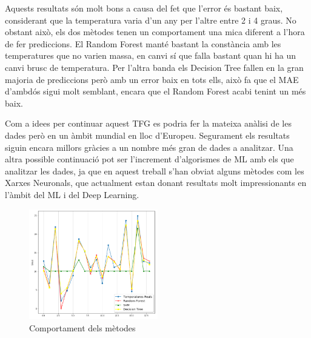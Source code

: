 \documentclass[10pt,a4paper,twocolumn,twoside]{article}
\begin{document}
Aquests resultats són molt bons a causa del fet que l'error és bastant baix, considerant que la temperatura varia d'un any per l'altre entre 2 i 4 graus. No obstant això, els dos mètodes tenen un comportament una mica diferent a l'hora de fer prediccions. El Random Forest manté bastant la constància amb les temperatures que no varien massa, en canvi sí que falla bastant quan hi ha un canvi brusc de temperatura. Per l'altra banda els Decision Tree fallen en la gran majoria de prediccions però amb un error baix en tots ells, això fa que el MAE d'ambdós sigui molt semblant, encara que el Random Forest acabi tenint un més baix.

Com a idees per continuar aquest TFG es podria fer la mateixa anàlisi de les dades però en un àmbit mundial en lloc d'Europeu. Segurament els resultats siguin encara millors gràcies a un nombre més gran de dades a analitzar. Una altra possible continuació pot ser l'increment d'algorismes de ML amb els que analitzar les dades, ja que en aquest treball s'han obviat alguns mètodes com les Xarxes Neuronals, que actualment estan donant resultats molt impressionants en l'àmbit del ML i del Deep Learning.
\begin{figure}[!h]
\centering
	\includegraphics[width=0.5\textwidth]{../img/comparacioAlgs}
	\caption{Comportament dels mètodes}
	\label{fig-temps}
\end{figure}
\end{document}
